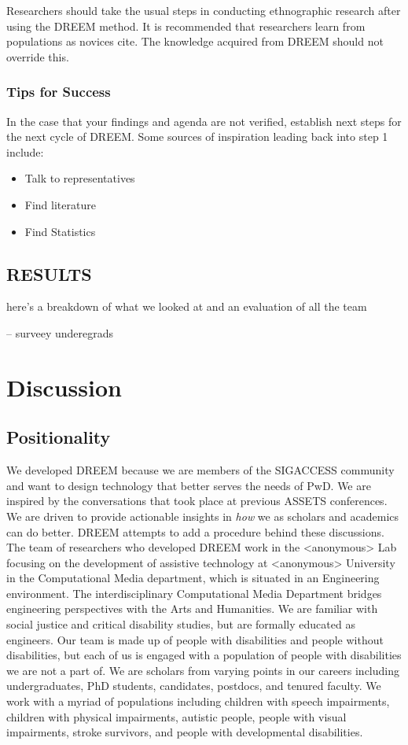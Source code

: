 Researchers should take the usual steps in conducting ethnographic research after using the DREEM method. It is recommended that researchers learn from populations as novices {\color{red}cite}. The knowledge acquired from DREEM should not override this. 

\subsubsection{Tips for Success}

In the case that your findings and agenda are not verified, establish next steps for the next cycle of DREEM. Some sources of inspiration leading back into step 1 include:

\begin{itemize}
\item Talk to representatives
\item Find literature
\item Find Statistics
\end{itemize}



\subsection{RESULTS}
here's a breakdown of what we looked at and an evaluation of all the team

-- surveey underegrads

\section{Discussion} \label{Discussion}
\subsection{Positionality}
We developed DREEM because we are members of the SIGACCESS community and want to design technology that better serves the needs of PwD. We are inspired by the conversations that took place at previous ASSETS conferences. We are driven to provide actionable insights in \textit{how} we as scholars and academics can do better. DREEM attempts to add a procedure behind these discussions. The team of researchers who developed DREEM work in the <anonymous> Lab focusing on the development of assistive technology at <anonymous> University in the Computational Media department, which is situated in an Engineering environment. The interdisciplinary Computational Media Department bridges engineering perspectives with the Arts and Humanities. We are familiar with social justice and critical disability studies, but are formally educated as engineers. Our team is made up of people with disabilities and people without disabilities, but each of us is engaged with a population of people with disabilities we are not a part of. We are scholars from varying points in our careers including undergraduates, PhD students, candidates, postdocs, and tenured faculty. We work with a myriad of populations including children with speech impairments, children with physical impairments, autistic people, people with visual impairments, stroke survivors, and people with developmental disabilities.

